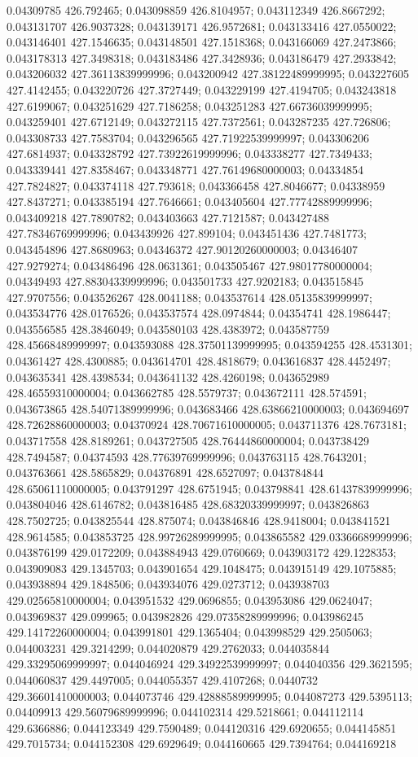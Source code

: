 0.04309785 426.792465; 0.043098859 426.8104957; 0.043112349 426.8667292; 0.043131707 426.9037328; 0.043139171 426.9572681; 0.043133416 427.0550022; 0.043146401 427.1546635; 0.043148501 427.1518368; 0.043166069 427.2473866; 0.043178313 427.3498318; 0.043183486 427.3428936; 0.043186479 427.2933842; 0.043206032 427.36113839999996; 0.043200942 427.38122489999995; 0.043227605 427.4142455; 0.043220726 427.3727449; 0.043229199 427.4194705; 0.043243818 427.6199067; 0.043251629 427.7186258; 0.043251283 427.66736039999995; 0.043259401 427.6712149; 0.043272115 427.7372561; 0.043287235 427.726806; 0.043308733 427.7583704; 0.043296565 427.71922539999997; 0.043306206 427.6814937; 0.043328792 427.73922619999996; 0.043338277 427.7349433; 0.043339441 427.8358467; 0.043348771 427.76149680000003; 0.04334854 427.7824827; 0.043374118 427.793618; 0.043366458 427.8046677; 0.04338959 427.8437271; 0.043385194 427.7646661; 0.043405604 427.77742889999996; 0.043409218 427.7890782; 0.043403663 427.7121587; 0.043427488 427.78346769999996; 0.043439926 427.899104; 0.043451436 427.7481773; 0.043454896 427.8680963; 0.04346372 427.90120260000003; 0.04346407 427.9279274; 0.043486496 428.0631361; 0.043505467 427.98017780000004; 0.04349493 427.88304339999996; 0.043501733 427.9202183; 0.043515845 427.9707556; 0.043526267 428.0041188; 0.043537614 428.05135839999997; 0.043534776 428.0176526; 0.043537574 428.0974844; 0.04354741 428.1986447; 0.043556585 428.3846049; 0.043580103 428.4383972; 0.043587759 428.45668489999997; 0.043593088 428.37501139999995; 0.043594255 428.4531301; 0.04361427 428.4300885; 0.043614701 428.4818679; 0.043616837 428.4452497; 0.043635341 428.4398534; 0.043641132 428.4260198; 0.043652989 428.46559310000004; 0.043662785 428.5579737; 0.043672111 428.574591; 0.043673865 428.54071389999996; 0.043683466 428.63866210000003; 0.043694697 428.72628860000003; 0.04370924 428.70671610000005; 0.043711376 428.7673181; 0.043717558 428.8189261; 0.043727505 428.76444860000004; 0.043738429 428.7494587; 0.04374593 428.77639769999996; 0.043763115 428.7643201; 0.043763661 428.5865829; 0.04376891 428.6527097; 0.043784844 428.65061110000005; 0.043791297 428.6751945; 0.043798841 428.61437839999996; 0.043804046 428.6146782; 0.043816485 428.68320339999997; 0.043826863 428.7502725; 0.043825544 428.875074; 0.043846846 428.9418004; 0.043841521 428.9614585; 0.043853725 428.99726289999995; 0.043865582 429.03366689999996; 0.043876199 429.0172209; 0.043884943 429.0760669; 0.043903172 429.1228353; 0.043909083 429.1345703; 0.043901654 429.1048475; 0.043915149 429.1075885; 0.043938894 429.1848506; 0.043934076 429.0273712; 0.043938703 429.02565810000004; 0.043951532 429.0696855; 0.043953086 429.0624047; 0.043969837 429.099965; 0.043982826 429.07358289999996; 0.043986245 429.14172260000004; 0.043991801 429.1365404; 0.043998529 429.2505063; 0.044003231 429.3214299; 0.044020879 429.2762033; 0.044035844 429.33295069999997; 0.044046924 429.34922539999997; 0.044040356 429.3621595; 0.044060837 429.4497005; 0.044055357 429.4107268; 0.0440732 429.36601410000003; 0.044073746 429.42888589999995; 0.044087273 429.5395113; 0.04409913 429.56079689999996; 0.044102314 429.5218661; 0.044112114 429.6366886; 0.044123349 429.7590489; 0.044120316 429.6920655; 0.044145851 429.7015734; 0.044152308 429.6929649; 0.044160665 429.7394764; 0.044169218 